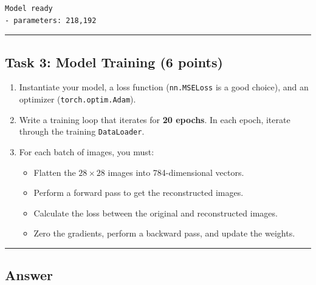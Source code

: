 \documentclass[
  letterpaper,
  DIV=11,
  numbers=noendperiod]{scrartcl}
\providecommand{\tightlist}{%
  \setlength{\itemsep}{0pt}\setlength{\parskip}{0pt}}\usepackage{longtable,booktabs,array}
\begin{document}
\label{task2}
\begin{verbatim}
Model ready
- parameters: 218,192
\end{verbatim}

\begin{center}\rule{0.5\linewidth}{0.5pt}\end{center}

\subsection{Task 3: Model Training (6
points)}\label{task-3-model-training-6-points}

\begin{enumerate}
\def\labelenumi{\arabic{enumi}.}
\tightlist
\item
  Instantiate your model, a loss function (\texttt{nn.MSELoss} is a good
  choice), and an optimizer (\texttt{torch.optim.Adam}).
\item
  Write a training loop that iterates for \textbf{20 epochs}. In each
  epoch, iterate through the training \texttt{DataLoader}.
\item
  For each batch of images, you must:

  \begin{itemize}
  \tightlist
  \item
    Flatten the \(28\times28\) images into 784-dimensional vectors.
  \item
    Perform a forward pass to get the reconstructed images.
  \item
    Calculate the loss between the original and reconstructed images.
  \item
    Zero the gradients, perform a backward pass, and update the weights.
  \end{itemize}
\end{enumerate}

\begin{center}\rule{0.5\linewidth}{0.5pt}\end{center}

\subsection{Answer}\label{answer-10}
\end{document}
